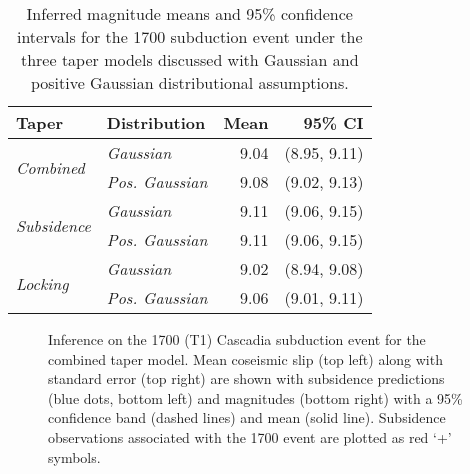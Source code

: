 {\begin{table}[ht]
\centering
\begin{tabular}{llrr}
  \hline
Taper & Distribution & Mean & 95\% CI \\ 
  \hline
\multirow{2}{*}{\textit{Combined}} & \textit{Gaussian} & 9.04 & (8.95, 9.11) \\ 
& \textit{Pos. Gaussian} & 9.08 & (9.02, 9.13) \\ 
\hline
\multirow{2}{*}{\textit{Subsidence}} & \textit{Gaussian}  & 9.11 & (9.06, 9.15) \\ 
  & \textit{Pos. Gaussian} & 9.11 & (9.06, 9.15) \\ 
  \hline
\multirow{2}{*}{\textit{Locking}} & \textit{Gaussian}  & 9.02 & (8.94, 9.08) \\ 
& \textit{Pos. Gaussian}& 9.06 & (9.01, 9.11) \\ 
   \hline
\end{tabular}
\caption{Inferred magnitude means and 95\% confidence intervals for the 1700 subduction event under the three taper models discussed with Gaussian and positive Gaussian distributional assumptions.}
\label{1700Magnitudes}
\end{table}

\begin{comment}
\begin{table}[ht]
\centering
\begin{tabular}{rrr}
  \hline
Model & Mean & 95\% CI  \\ 
  \hline
Combined & 9.04 & (8.95, 9.11) \\ 
  Subsidence & 9.11 & (9.06, 9.15) \\ 
  Locking & 9.02 & (8.94, 9.08) \\ 
   \hline
\end{tabular}
\caption{Inferred magnitude means and 95\% confidence intervals for the 1700 subduction event under the three taper models discussed.}
\label{1700Magnitudes}
\end{table}
\end{comment}

\begin{figure}
\centering
{}
\caption{Inference on the 1700 (T1) Cascadia subduction event for the combined taper model.  Mean coseismic slip (top left) along with standard error (top right) are shown with subsidence predictions (blue dots, bottom left) and magnitudes (bottom right) with a 95\% confidence band (dashed lines) and mean (solid line).  Subsidence observations associated with the 1700 event are plotted as red `+' symbols.}
\label{T1Comb}
\end{figure}

}
